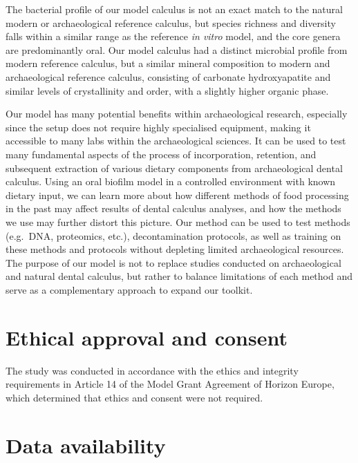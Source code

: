 \documentclass[10pt,a4paper]{article}
\begin{document}
The bacterial profile of our model calculus is not an exact match to the
natural modern or archaeological reference calculus, but species
richness and diversity falls within a similar range as the reference
\emph{in vitro} model, and the core genera are predominantly oral. Our
model calculus had a distinct microbial profile from modern reference
calculus, but a similar mineral composition to modern and archaeological
reference calculus, consisting of carbonate hydroxyapatite and similar
levels of crystallinity and order, with a slightly higher organic phase.

Our model has many potential benefits within archaeological research,
especially since the setup does not require highly specialised
equipment, making it accessible to many labs within the archaeological
sciences. It can be used to test many fundamental aspects of the process
of incorporation, retention, and subsequent extraction of various
dietary components from archaeological dental calculus. Using an oral
biofilm model in a controlled environment with known dietary input, we
can learn more about how different methods of food processing in the
past may affect results of dental calculus analyses, and how the methods
we use may further distort this picture. Our method can be used to test
methods (e.g.~DNA, proteomics, etc.), decontamination protocols, as well
as training on these methods and protocols without depleting limited
archaeological resources. The purpose of our model is not to replace
studies conducted on archaeological and natural dental calculus, but
rather to balance limitations of each method and serve as a
complementary approach to expand our toolkit.

\section*{Ethical approval and
consent}\label{ethical-approval-and-consent}

The study was conducted in accordance with the ethics and integrity
requirements in Article 14 of the Model Grant Agreement of Horizon
Europe, which determined that ethics and consent were not required.

\section*{Data availability}\label{data-availability}
\end{document}
